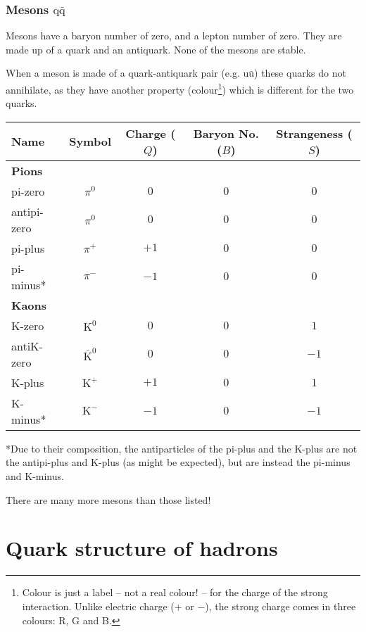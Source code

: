 \documentclass[a4paper,12pt]{article}
\begin{document}
\subsubsection{Mesons $\mathrm{q}\bar{\mathrm{q}}$}

Mesons have a baryon number of zero, and a lepton number of zero.  They are made up of a quark and an antiquark.  None of the mesons are stable.

When a meson is made of a quark-antiquark pair (e.g. $\mathrm{u}\bar{\mathrm{u}}$) these quarks do not annihilate, as they have another property (colour\footnote{Colour is just a label -- not a real colour! -- for the charge of the strong interaction.  Unlike electric charge ($+$ or $-$), the strong charge comes in three colours: R, G and B.}) which is different for the two quarks.\\

\begin{tabular}{lcccc}
\hline
\hline
Name & Symbol & Charge ($Q$) & Baryon No. ($B$) & Strangeness ($S$)\\
\hline
{\bf Pions} \\
pi-zero & $\pi^{0}$ & $0$ & $0$ & $0$ \\
antipi-zero & $\pi^{0}$ & $0$ & $0$ & $0$ \\
pi-plus & $\pi^{+}$ & $+1$ & $0$ & $0$ \\
pi-minus* & $\pi^{-}$ & $-1$ & $0$ & $0$ \\
\hline
{\bf Kaons} \\
K-zero & $\mathrm{K}^{0}$ & $0$ & $0$ & $1$ \\
antiK-zero & $\bar{\mathrm{K}}^{0}$ & $0$ & $0$ & $-1$ \\
K-plus & $\mathrm{K}^{+}$ & $+1$ & $0$ & $1$ \\
K-minus* & $\mathrm{K}^{-}$ & $-1$ & $0$ & $-1$ \\
\hline
\hline
\end{tabular}
*Due to their composition, the antiparticles of the pi-plus and the K-plus are not the antipi-plus and K-plus (as might be expected), but are instead the pi-minus and K-minus.

There are many more mesons than those listed!


\section{Quark structure of hadrons}
\end{document}
